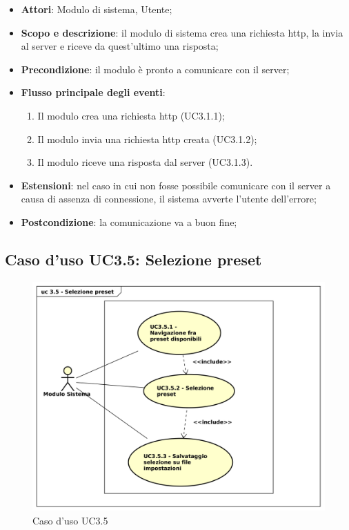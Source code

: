 \begin{itemize}
\item \textbf{Attori}: Modulo di sistema, Utente;
\item \textbf{Scopo e descrizione}: il modulo di sistema crea una richiesta http, la invia al server e riceve da quest'ultimo una risposta;
\item \textbf{Precondizione}: il modulo è pronto a comunicare con il server;
\item \textbf{Flusso principale degli eventi}:
\begin{enumerate}
\item Il modulo crea una richiesta http (UC3.1.1);
\item Il modulo invia una richiesta http creata (UC3.1.2);
\item Il modulo riceve una risposta dal server (UC3.1.3).
\end{enumerate}
\item \textbf{Estensioni}: nel caso in cui non fosse possibile comunicare con il server a causa di assenza di connessione, il sistema avverte l'utente dell'errore;  
\item \textbf{Postcondizione}: la comunicazione va a buon fine;
\end{itemize}

\subsection{Caso d'uso UC3.5: Selezione preset}

\begin{figure}[htbp]
\centering
\includegraphics[scale=0.5]{UseCase_17_03_2016/immagini/uc_3_5_selezione_preset.png}
\captionsetup{labelfont=bf}
\caption{Caso d'uso UC3.5}
\end{figure}

